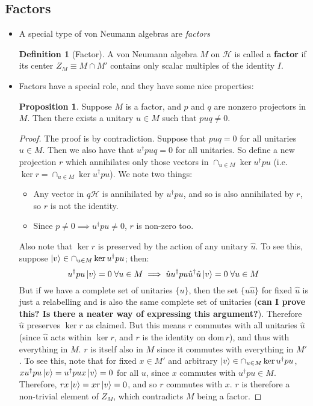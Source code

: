 \documentclass[12pt,a4paper]{article}
\numberwithin{equation}{section}
\theoremstyle{definition}
\newtheorem{definition}{Definition}[section]
\theoremstyle{theorem}
\newtheorem{proposition}{Proposition}
\begin{document}
	\subsection{Factors}
	\begin{itemize} 
		\item A special type of von Neumann algebras are \textit{factors}
		\begin{definition}[Factor]
			A von Neumann algebra $M$ on $\mathcal{H}$ is called a \textbf{factor} if its center $Z_{M}\equiv M\cap M'$ contains only scalar multiples of the identity $I$.
		\end{definition}
		\item Factors have a special role, and they have some nice properties:
		\begin{proposition}
			Suppose $M$ is a factor, and $p$ and $q$ are nonzero projectors in $M$. Then there exists a unitary $u\in M$ such that $puq\neq 0$.
		\end{proposition}
		\begin{proof}
			The proof is by contradiction. Suppose that $puq=0$ for all unitaries $u\in M$. Then we also have that $u^{\dagger}puq=0$ for all unitaries. So define a new projection $r$ which annihilates only those vectors in $\cap_{u\in M}\ker{u^{\dagger}pu}$ (i.e. $\ker{r}=\cap_{u\in M}\ker{u^{\dagger}pu}$). We note two things:
			\begin{itemize}
				\item Any vector in $q\mathcal{H}$ is annihilated by $u^{\dagger}pu$, and so is also annihilated by $r$, so $r$ is not the identity.
				\item Since $p\neq0\implies u^{\dagger}pu\neq0$, $r$ is non-zero too.
			\end{itemize}
			Also note that $\ker{r}$ is preserved by the action of any unitary $\hat{u}$. To see this, suppose $\ket{v}\in \cap_{u\in M}\ker{u^{\dagger}pu}$; then:
			\begin{equation}
				u^{\dagger}pu\ket{v}=0\;\forall u\in M\implies \hat{u}u^{\dagger}pu\hat{u}^{\dagger}\hat{u}\ket{v}=0\;\forall u\in M
			\end{equation}
			But if we have a complete set of unitaries $\{u\}$, then the set $\{u\hat{u}\}$ for fixed $\hat{u}$ is just a relabelling and is also the same complete set of unitaries (\textbf{can I prove this? Is there a neater way of expressing this argument?}). Therefore $\hat{u}$ preserves $\ker{r}$ as claimed. But this means $r$ commutes with all unitaries $\hat{u}$ (since $\hat{u}$ acts within $\ker{r}$, and $r$ is the identity on $\text{dom}\,{r}$), and thus with everything in $M$. $r$ is itself also in $M$ since it commutes with everything in $M'$. To see this, note that for fixed $x\in M'$ and arbitrary $\ket{v}\in\cap_{u\in M}\ker{u^{\dagger}pu}$, $xu^{\dagger}pu\ket{v}=u^{\dagger}pux\ket{v}=0$ for all $u$, since $x$ commutes with $u^{\dagger}pu\in M$. Therefore, $rx\ket{v}=xr\ket{v}=0$, and so $r$ commutes with $x$. $r$ is therefore a non-trivial element of $Z_{M}$, which contradicts $M$ being a factor. 

\end{proof}
\end{itemize}
\end{document}
